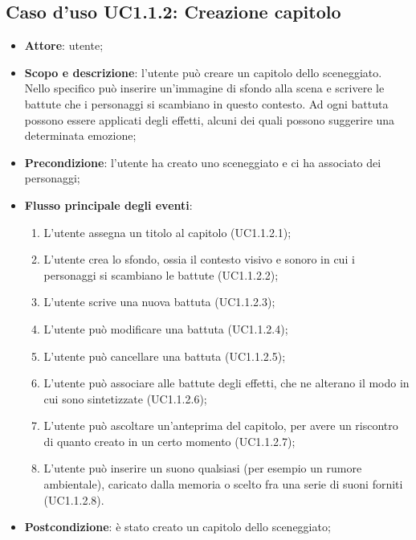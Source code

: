 \subsection{Caso d'uso UC1.1.2: Creazione capitolo}
\label{sec:UC1.1.2}

\begin{itemize}
\item \textbf{Attore}: utente;
\item \textbf{Scopo e descrizione}: l'utente può creare un capitolo dello sceneggiato. Nello specifico può inserire un'immagine di sfondo alla scena e scrivere le battute che i personaggi si scambiano in questo contesto. Ad ogni battuta possono essere applicati degli effetti, alcuni dei quali possono suggerire una determinata emozione;
\item \textbf{Precondizione}: l'utente ha creato uno sceneggiato e ci ha associato dei personaggi;
\item \textbf{Flusso principale degli eventi}:
\begin{enumerate}
\item L'utente assegna un titolo al capitolo (UC1.1.2.1);
\item L'utente crea lo sfondo, ossia il contesto visivo e sonoro in cui i personaggi si scambiano le battute (UC1.1.2.2);
\item L'utente scrive una nuova battuta (UC1.1.2.3);
\item L'utente può modificare una battuta (UC1.1.2.4);
\item L'utente può cancellare una battuta (UC1.1.2.5);
\item L'utente può associare alle battute degli effetti, che ne alterano il modo in cui sono sintetizzate (UC1.1.2.6);
\item L'utente può ascoltare un'anteprima del capitolo, per avere un riscontro di quanto creato in un certo momento (UC1.1.2.7);
\item L'utente può inserire un suono qualsiasi (per esempio un rumore ambientale), caricato dalla memoria o scelto fra una serie di suoni forniti (UC1.1.2.8). 
\end{enumerate} 
\item \textbf{Postcondizione}: è stato creato un capitolo dello sceneggiato;
\end{itemize}
